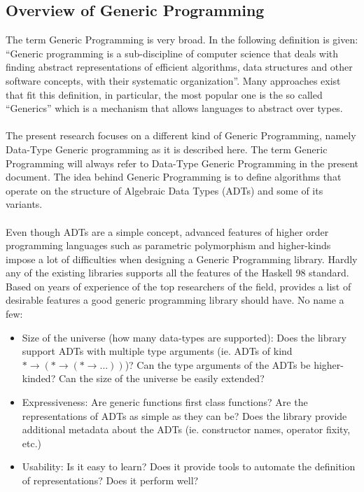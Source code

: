 \documentclass[8pt]{extarticle}
\begin{document}
\subsection{Overview of Generic Programming}
The term Generic Programming is very broad. In \cite{GenLangComp} the following definition is given: ``Generic programming is a sub-discipline of computer science that deals with finding abstract representations of efficient algorithms, data structures and other software concepts, with their systematic organization''. Many approaches exist that fit this definition, in particular, the most popular one is the so called ``Generics''\cite{GenLangComp} which is a mechanism that allows languages to abstract over types.
\\\\
The present research focuses on a different kind of Generic Programming, namely Data-Type Generic programming as it is described here\cite{CompGen}. The term Generic Programming will always refer to Data-Type Generic Programming in the present document. The idea behind Generic Programming is to define algorithms that operate on the structure of Algebraic Data Types (ADTs) and some of its variants.
\\\\
Even though ADTs are a simple concept, advanced features of higher order programming languages such as parametric polymorphism and higher-kinds impose a lot of difficulties when designing a Generic Programming library. Hardly any of the existing libraries \cite{CompGen} supports all the features of the Haskell 98 standard. Based on years of experience of the top researchers of the field, \cite{CompGen} provides a list of desirable features a good generic programming library should have. No name a few:
\begin{itemize}
\item Size of the universe (how many data-types are supported): Does the library support ADTs with multiple type arguments (ie. ADTs of kind $*\to (* \to (*\to ...))$)? Can the type arguments of the ADTs be higher-kinded? Can the size of the universe be easily extended?
\item Expressiveness: Are generic functions first class functions? Are the representations of ADTs as simple as they can be? Does the library provide additional metadata about the ADTs (ie. constructor names, operator fixity, etc.)
\item Usability: Is it easy to learn? Does it provide tools to automate the definition of representations? Does it perform well?
\end{itemize}
\end{document}
